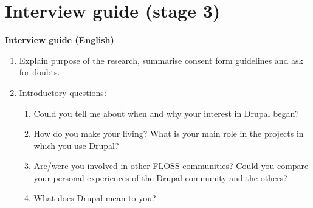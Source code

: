 \chapter{Interview guide (stage 3)}
\label{appendix-interview-guide-stage-3}

\newpage
	
\hrulefill\par

\begin{center}
\textbf{Interview guide (English)}
\end{center}

\begin{enumerate}
	\item Explain purpose of the research, summarise consent form guidelines and ask for doubts.
	\item Introductory questions:
		\begin{enumerate}
			\item Could you tell me about when and why your interest in Drupal began?
			\item How do you make your living? What is your main role in the projects in which you use Drupal?
			\item Are\slash were you involved in other FLOSS communities? Could you compare your personal experiences of the Drupal community and the others? 
			\item What does Drupal mean to you?
		\end{enumerate}
	

\end{enumerate}
